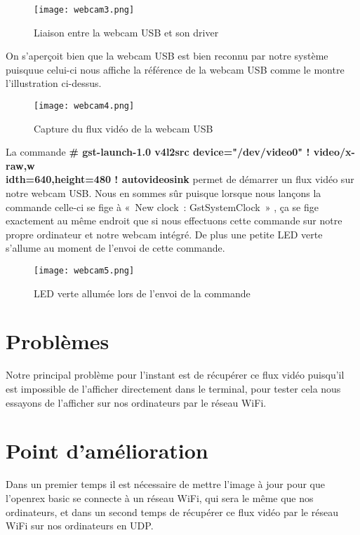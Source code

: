 \begin{figure}[th]
    \centering
    \texttt{[image: webcam3.png]}
    \decoRule
    \caption{Liaison entre la webcam USB et son driver}  \label{fig:webcam3}   
\end{figure}

On s’aperçoit bien que la webcam USB est bien reconnu par notre système puisquue
celui-ci nous affiche la référence de la webcam USB comme le montre l’illustration ci-dessus.

\begin{figure}[th]
    \centering
    \texttt{[image: webcam4.png]}
    \decoRule
    \caption{Capture du flux vidéo de la webcam USB}  \label{fig:webcam4}   
\end{figure}

La commande \textbf{\# gst-launch-1.0 v4l2src device="/dev/video0" ! video/x-raw,w \\
idth=640,height=480 ! autovideosink} permet de démarrer un flux vidéo sur notre webcam USB.
Nous en sommes sûr puisque lorsque nous lançons la commande celle-ci se fige à « New clock :
GstSystemClock » , ça se fige exactement au même endroit que si nous effectuons cette commande
sur notre propre ordinateur et notre webcam intégré. De plus une petite LED verte s’allume
au moment de l’envoi de cette commande.

\begin{figure}[th]
    \centering
    \texttt{[image: webcam5.png]}
    \decoRule
    \caption{LED verte allumée lors de l'envoi de la commande}  \label{fig:webcam5}   
\end{figure}

\section{Problèmes}

Notre principal problème pour l’instant est de récupérer ce flux vidéo puisqu’il
est impossible de l’afficher directement dans le terminal, pour tester cela nous
essayons de l’afficher sur nos ordinateurs par le réseau WiFi. 

\section{Point d'amélioration}

Dans un premier temps il est nécessaire de mettre l’image à jour pour que l’openrex
basic se connecte à un réseau WiFi, qui sera le même que nos ordinateurs, et dans un
second temps de récupérer ce flux vidéo par le réseau WiFi sur nos ordinateurs en UDP.


